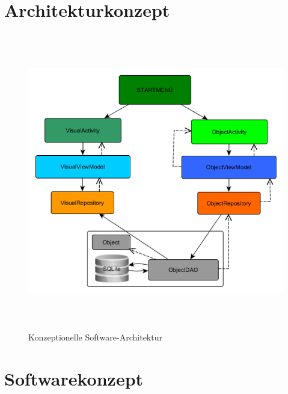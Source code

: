 \section{Architekturkonzept}
\label{chap:Architekturkonzept}
\begin{figure}[hbt!]
    \centering
    \includegraphics[width=13cm,height=13cm,keepaspectratio]{3Konzeption/Bilder/architektur_konzept.png}
    \caption{Konzeptionelle Software-Architektur}
    \label{pic:architectur}
\end{figure} 

\section{Softwarekonzept}
\label{chap:Softwarekonzept}

